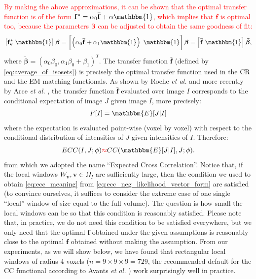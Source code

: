 \textcolor{red}{By making the above approximations, it can be shown that the optimal transfer function is of the form $\mathbf{f^{*}} = \alpha_{0} \mathbf{\bar{f}} + \alpha\mathbbm{1}$, which implies that $\mathbf{\bar{f}}$ is optimal too, because the parameters $\boldsymbol{\beta}$ can be adjusted to obtain the same goodness of fit:
\begin{displaymath}
    \left[\mathbf{f^{*}_{v}} \; \mathbbm{1}\right]\boldsymbol{\beta} = 
    \left[\left(\alpha_{0} \mathbf{\bar{f}} + \alpha_{1}\mathbbm{1}\right) \; \mathbbm{1}\right]\boldsymbol{\beta} =
    \left[\mathbf{\bar{f}} \; \mathbbm{1}\right]\boldsymbol{\tilde{\beta}},
\end{displaymath}
}where $\boldsymbol{\tilde{\beta}} = (\alpha_{0}\beta_{0}, \alpha_{1}\beta_{0} + \beta_{1})^{T}$. The transfer function $\mathbf{\bar{f}}$ (defined by \eqref{eq:average_of_isosets}) is precisely the optimal transfer function used in the CR and the EM matching functionals. As shown by Roche {\it et al.} \cite{Roche1998, Roche2000} and more recently by Arce {\it et al.} \cite{Arce-santana2014}, the transfer function $\mathbf{\bar{f}}$ evaluated over image $I$ corresponds to the conditional expectation of image $J$ given image $I$, more precisely:
\begin{equation*}
    F[I] = \mathbbm{E}[J | I]
\end{equation*}
where the expectation is evaluated point-wise (voxel by voxel) with respect to the conditional distribution of intensities of $J$ given intensities of $I$. Therefore:
\begin{equation}\label{eq:ecc_meaning}
    ECC(I, J; \phi) \textcolor{red}{\approx} CC(\mathbbm{E}[J|I], J ; \phi).
\end{equation}
from which we adopted the name ``Expected Cross Correlation''. Notice that, if the local windows $W_{\mathbf{v}}, \mathbf{v}\in\Omega_{I}$ are sufficiently large, then the condition we used to obtain \eqref{eq:ecc_meaning} from \eqref{eq:ecc_neg_likelihood_vector_form} are satisfied (to convince ourselves, it suffices to consider the extreme case of one single ``local'' window of size equal to the full volume). The question is how small the local windows can be so that this condition is reasonably satisfied. Please note that, in practice, we do not need this condition to be satisfied everywhere, but we only need that the optimal $\mathbf{f}$ obtained under the given assumptions is reasonably close to the optimal $\mathbf{f}$ obtained without making the assumption. From our experiments, as we will show below, we have found that rectangular local windows of radius $4$ voxels ($n=9\times 9\times 9 = 729$, the recommended default for the CC functional according to Avants {\it et al.} \cite{Avants2011}) work surprisingly well in practice.\\

